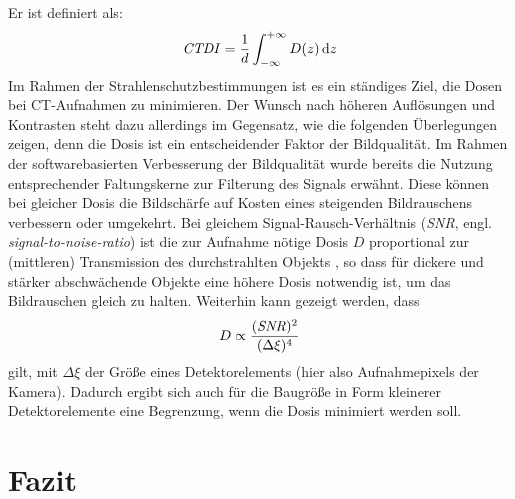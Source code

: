 \documentclass[11pt, a4paper]{article}
\numberwithin{equation}{section}
\begin{document}
Er ist definiert als:
\begin{align}
	\text{\emph{CTDI}}=\frac{1}{d}\int_{-\infty}^{+\infty}D(z)\,\mathrm{d}z
\end{align}
Im Rahmen der Strahlenschutzbestimmungen ist es ein ständiges Ziel, die Dosen bei CT-Aufnahmen zu minimieren.
Der Wunsch nach höheren Auflösungen und Kontrasten steht dazu allerdings im Gegensatz, wie die folgenden Überlegungen zeigen, denn die Dosis ist ein entscheidender Faktor der Bildqualität.
Im Rahmen der softwarebasierten Verbesserung der Bildqualität wurde bereits die Nutzung entsprechender Faltungskerne zur Filterung des Signals erwähnt.
Diese können bei gleicher Dosis die Bildschärfe auf Kosten eines steigenden Bildrauschens verbessern oder umgekehrt.
Bei gleichem Signal-Rausch-Verhältnis (\emph{SNR}, engl. \emph{signal-to-noise-ratio}) ist die zur Aufnahme nötige Dosis $D$ proportional zur (mittleren) Transmission des durchstrahlten Objekts \cite{buzug}, so dass für dickere und stärker abschwächende Objekte eine höhere Dosis notwendig ist, um das Bildrauschen gleich zu halten. 
Weiterhin kann gezeigt werden, dass
\begin{align}
	D \propto \frac{(\text{\emph{SNR}})^2}{(\Delta\xi)^4}
\end{align}
gilt, mit $\Delta\xi$ der Größe eines Detektorelements (hier also Aufnahmepixels der Kamera).
Dadurch ergibt sich auch für die Baugröße in Form kleinerer Detektorelemente eine Begrenzung, wenn die Dosis minimiert werden soll.
\section{Fazit}
\end{document}
